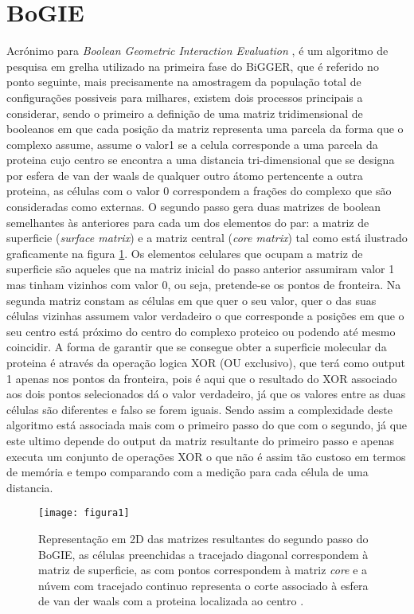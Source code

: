 \section{BoGIE}
\label{bogieAlg}
Acrónimo para \textit{Boolean Geometric Interaction Evaluation}\cite{teseProf} \cite{biggerPaper}, é um algoritmo de pesquisa em grelha utilizado na primeira fase do BiGGER, que é referido no ponto seguinte, mais precisamente na amostragem da população total de configurações possiveis para milhares, existem dois processos principais a considerar, sendo o primeiro a definição de uma matriz tridimensional de booleanos em que cada posição da matriz representa uma parcela da forma que o complexo assume, assume o valor1 se a celula corresponde a uma parcela da proteina cujo centro se encontra a uma distancia tri-dimensional que se designa por esfera de van der waals de qualquer outro átomo pertencente a outra proteina, as células com o valor 0 correspondem a frações do complexo que são consideradas como externas.
O segundo passo gera duas matrizes de boolean semelhantes às anteriores para cada um dos elementos do par: a matriz de superficie (\textit{surface matrix}) e a matriz central (\textit{core matrix}) tal como está ilustrado graficamente na figura \ref{fig:fig2subfig}. Os elementos celulares que ocupam a matriz de superficie são aqueles que na matriz inicial do passo anterior assumiram valor 1 mas tinham vizinhos com valor 0, ou seja, pretende-se os pontos de fronteira. Na segunda matriz constam as células em que quer o seu valor, quer o das suas células vizinhas assumem valor verdadeiro o que corresponde a posições em que o seu centro está próximo do centro do complexo proteico ou podendo até mesmo coincidir. A forma de garantir que se consegue obter a superficie molecular da proteina é através da operação logica XOR (OU exclusivo), que terá como output 1 apenas nos pontos da fronteira, pois é aqui que o resultado do XOR associado aos dois pontos selecionados dá o valor verdadeiro, já que os valores entre as duas células são diferentes e falso se forem iguais.
Sendo assim  a complexidade deste algoritmo está associada mais com o primeiro passo do que com o segundo, já que este ultimo depende do output da matriz resultante do primeiro passo e apenas executa um conjunto de operações XOR o que não é assim tão custoso em termos de memória e tempo comparando com a medição para cada célula de uma distancia.
\begin{figure}[ht]
  \centering
    {\texttt{[image: figura1]}}
  \caption{Representação em 2D das matrizes resultantes do segundo passo do BoGIE, as células preenchidas a tracejado diagonal correspondem à matriz de superficie, as com pontos correspondem à matriz \textit{core} e a núvem com tracejado continuo representa o corte associado à esfera de van der waals com a proteina localizada ao centro \cite{biggerPaper}.}
  \label{fig:fig2subfig}
\end{figure}

